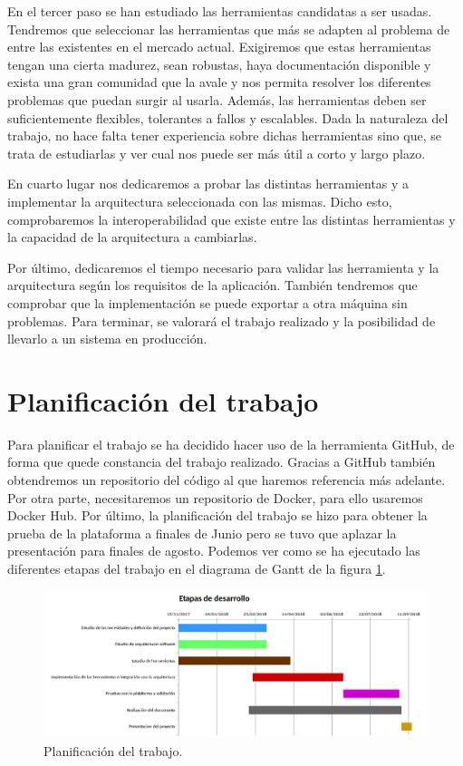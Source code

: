 En el tercer paso se han estudiado las herramientas candidatas a ser
usadas. Tendremos que seleccionar las herramientas que más se adapten
al problema de entre las existentes en el mercado actual.
Exigiremos que estas herramientas tengan una cierta madurez, sean
robustas, haya documentación disponible y exista una gran comunidad
que la avale y nos permita resolver los diferentes problemas que
puedan surgir al usarla. Además, las herramientas deben ser
suficientemente flexibles, tolerantes a fallos y escalables. Dada la
naturaleza del trabajo, no hace falta tener experiencia sobre dichas
herramientas sino que, se trata de estudiarlas y ver cual nos puede
ser más útil a corto y largo plazo.

En cuarto lugar nos dedicaremos a probar las distintas herramientas y
a implementar la arquitectura seleccionada con las mismas. Dicho esto,
comprobaremos la interoperabilidad que existe entre las distintas
herramientas y la capacidad de la arquitectura a cambiarlas.


Por último, dedicaremos el tiempo necesario para validar las
herramienta y la arquitectura según los requisitos de la aplicación.
También tendremos que comprobar que la implementación se puede
exportar a otra máquina sin problemas. Para terminar, se valorará el
trabajo realizado y la posibilidad de llevarlo a un sistema en
producción.

\section{Planificación del trabajo\label{planificacion}}

Para planificar el trabajo se ha decidido hacer uso de la herramienta
GitHub, de forma que quede constancia del trabajo realizado. Gracias a
GitHub también obtendremos un repositorio del código al que haremos
referencia más adelante. Por otra parte, necesitaremos un repositorio
de Docker, para ello usaremos Docker Hub. Por último, la planificación
del trabajo se hizo para obtener la prueba de la plataforma a finales
de Junio pero se tuvo que aplazar la presentación para finales de
agosto. Podemos ver como se ha ejecutado las diferentes etapas del
trabajo en el diagrama de Gantt de la figura \ref{etapas}.

\begin{figure}[htp]
\centering
\includegraphics[scale=0.57]{Imagenes/Etapasv2.png}
\caption{Planificación del trabajo.}
\label{etapas}
\end{figure}



